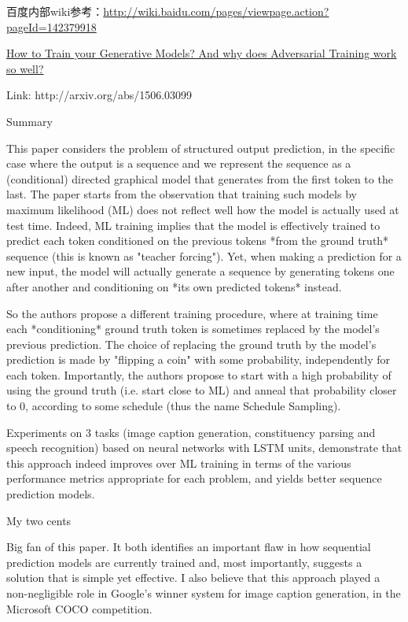 \documentclass[UTF8,10pt,a4paper]{ctexbook}
\begin{document}
百度内部wiki参考：\url{http://wiki.baidu.com/pages/viewpage.action?pageId=142379918}


\href{http://www.inference.vc/how-to-train-your-generative-models-why-generative-adversarial-networks-work-so-well-2/}{How to Train your Generative Models? And why does Adversarial Training work so well?}


Link: http://arxiv.org/abs/1506.03099

Summary

This paper considers the problem of structured output prediction, in the specific case where the output is a sequence and we represent the sequence as a (conditional) directed graphical model that generates from the first token to the last. The paper starts from the observation that training such models by maximum likelihood (ML) does not reflect well how the model is actually used at test time. Indeed, ML training implies that the model is effectively trained to predict each token conditioned on the previous tokens *from the ground truth* sequence (this is known as "teacher forcing"). Yet, when making a prediction for a new input, the model will actually generate a sequence by generating tokens one after another and conditioning on *its own predicted tokens* instead. 

So the authors propose a different training procedure, where at training time each *conditioning* ground truth token is sometimes replaced by the model's previous prediction. The choice of replacing the ground truth by the model's prediction is made by "flipping a coin" with some probability, independently for each token. Importantly, the authors propose to start with a high probability of using the ground truth (i.e. start close to ML) and anneal that probability closer to 0, according to some schedule (thus the name Schedule Sampling). 

Experiments on 3 tasks (image caption generation, constituency parsing and speech recognition) based on neural networks with LSTM units, demonstrate that this approach indeed improves over ML training in terms of the various performance metrics appropriate for each problem, and yields better sequence prediction models. 



My two cents

Big fan of this paper. It both identifies an important flaw in how sequential prediction models are currently trained and, most importantly, suggests a solution that is simple yet effective. I also believe that this approach played a non-negligible role in Google's winner system for image caption generation, in the Microsoft COCO competition. 
\end{document}
